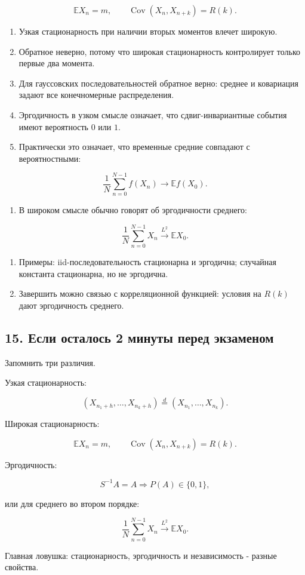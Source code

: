\documentclass[
  11pt,
  a4paper,
]{article}
\providecommand{\tightlist}{%
  \setlength{\itemsep}{0pt}\setlength{\parskip}{0pt}}
\begin{document}
\[
\mathbb E X_n=m,
\qquad
\operatorname{Cov}(X_n,X_{n+k})=R(k).
\]

\begin{enumerate}
\def\labelenumi{\arabic{enumi}.}
\setcounter{enumi}{4}
\tightlist
\item
  Узкая стационарность при наличии вторых моментов влечет широкую.
\item
  Обратное неверно, потому что широкая стационарность контролирует
  только первые два момента.
\item
  Для гауссовских последовательностей обратное верно: среднее и
  ковариация задают все конечномерные распределения.
\item
  Эргодичность в узком смысле означает, что сдвиг-инвариантные события
  имеют вероятность \(0\) или \(1\).
\item
  Практически это означает, что временные средние совпадают с
  вероятностными:
\end{enumerate}

\[
\frac1N\sum_{n=0}^{N-1}f(X_n)\to\mathbb E f(X_0).
\]

\begin{enumerate}
\def\labelenumi{\arabic{enumi}.}
\setcounter{enumi}{9}
\tightlist
\item
  В широком смысле обычно говорят об эргодичности среднего:
\end{enumerate}

\[
\frac1N\sum_{n=0}^{N-1}X_n
\xrightarrow{L^2}
\mathbb E X_0.
\]

\begin{enumerate}
\def\labelenumi{\arabic{enumi}.}
\setcounter{enumi}{10}
\tightlist
\item
  Примеры: iid-последовательность стационарна и эргодична; случайная
  константа стационарна, но не эргодична.
\item
  Завершить можно связью с корреляционной функцией: условия на \(R(k)\)
  дают эргодичность среднего.
\end{enumerate}

\subsection{15. Если осталось 2 минуты перед
экзаменом}\label{ux435ux441ux43bux438-ux43eux441ux442ux430ux43bux43eux441ux44c-2-ux43cux438ux43dux443ux442ux44b-ux43fux435ux440ux435ux434-ux44dux43aux437ux430ux43cux435ux43dux43eux43c}

Запомнить три различия.

Узкая стационарность:

\[
(X_{n_1+h},\ldots,X_{n_k+h})
\stackrel d=
(X_{n_1},\ldots,X_{n_k}).
\]

Широкая стационарность:

\[
\mathbb E X_n=m,
\qquad
\operatorname{Cov}(X_n,X_{n+k})=R(k).
\]

Эргодичность:

\[
S^{-1}A=A
\Rightarrow
P(A)\in\{0,1\},
\]

или для среднего во втором порядке:

\[
\frac1N\sum_{n=0}^{N-1}X_n
\xrightarrow{L^2}
\mathbb E X_0.
\]

Главная ловушка: стационарность, эргодичность и независимость - разные
свойства.

\newpage
\end{document}
